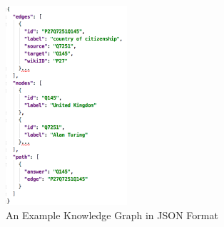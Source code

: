 \documentclass[bsc,frontabs,twoside,singlespacing,parskip,deptreport]{infthesis}     %
\begin{document}
\begin{figure}[h]
    \centering
    \includegraphics[width=0.4\textwidth]{gkjson.png}
    \caption{An Example Knowledge Graph in JSON Format}
    \label{fig:kgjson}
\end{figure}
\end{document}
